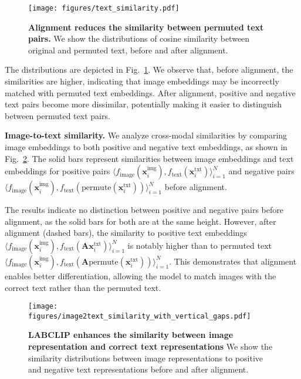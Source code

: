 \begin{figure}
  \centering
   \texttt{[image: figures/text\_similarity.pdf]}
   \vspace{-2.3em}
   \caption{\textbf{Alignment reduces the similarity between permuted text pairs.} We show the distributions of cosine similarity between original and permuted text, before and after alignment.}%
   \label{fig:similarity_analysis_t2t}
\end{figure}

The distributions are depicted in Fig.~\ref{fig:similarity_analysis_t2t}. We observe that, before alignment, the similarities are higher, indicating that image embeddings may be incorrectly matched with permuted text embeddings. After alignment, positive and negative text pairs become more dissimilar, potentially making it easier to distinguish between permuted text pairs.






\noindent
\textbf{Image-to-text similarity.} We analyze cross-modal similarities by comparing image embeddings to both positive and negative text embeddings, as shown in Fig.~\ref{fig:similarity_analysis_i2t}. The solid bars represent similarities between image embeddings and text embeddings for positive pairs \( \langle f_{\text{image}}(\mathbf{x}^{\text{img}}_i), f_{\text{text}}(\mathbf{x}^{\text{txt}}_i) \rangle_{i=1}^N \) and negative pairs \( \langle f_{\text{image}}(\mathbf{x}^{\text{img}}_i), f_{\text{text}}(\text{permute}(\mathbf{x}^{\text{txt}}_i)) \rangle_{i=1}^N \) before alignment.

The results indicate no distinction between positive and negative pairs before alignment, as the solid bars for both are at the same height. However, after alignment (dashed bars), the similarity to positive text embeddings \( \langle f_{\text{image}}(\mathbf{x}^{\text{img}}_i), f_{\text{text}}(\mathbf{A} \mathbf{x}^{\text{txt}}_i) \rangle_{i=1}^N \) is notably higher than to permuted text \( \langle f_{\text{image}}(\mathbf{x}^{\text{img}}_i), f_{\text{text}}(\mathbf{A} \text{permute}(\mathbf{x}^{\text{txt}}_i)) \rangle_{i=1}^N \). This demonstrates that alignment enables better differentiation, allowing the model to match images with the correct text rather than the permuted text.


\begin{figure}
  \centering
   \texttt{[image: figures/image2text\_similarity\_with\_vertical\_gaps.pdf]}
   \vspace{-2em}
   \caption{\textbf{LABCLIP enhances the similarity between image representation and correct text representations} We show the similarity distributions between image representations to positive and negative text representations before and after alignment.} %
   \label{fig:similarity_analysis_i2t}
\end{figure}


